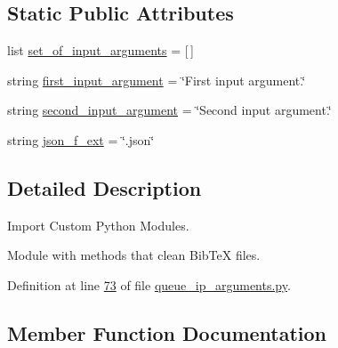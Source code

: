 \subsection*{Static Public Attributes}
\begin{DoxyCompactItemize}
\item 
list \hyperlink{classutilities_1_1queue__ip__arguments_1_1queue__ip__args_acc8e7685be71a7f95ede7c980355c9f3}{set\+\_\+of\+\_\+input\+\_\+arguments} = \mbox{[}$\,$\mbox{]}
\item 
string \hyperlink{classutilities_1_1queue__ip__arguments_1_1queue__ip__args_a14394c9820086e09d5b926d9910a180f}{first\+\_\+input\+\_\+argument} = \char`\"{}First input argument.\char`\"{}
\item 
string \hyperlink{classutilities_1_1queue__ip__arguments_1_1queue__ip__args_a0b179a70c0e57de2794d0d532e534c9c}{second\+\_\+input\+\_\+argument} = \char`\"{}Second input argument.\char`\"{}
\item 
string \hyperlink{classutilities_1_1queue__ip__arguments_1_1queue__ip__args_a8d93f9ade7608583602a9948c0d744f7}{json\+\_\+f\+\_\+ext} = \char`\"{}.json\char`\"{}
\end{DoxyCompactItemize}


\subsection{Detailed Description}
Import Custom Python Modules. 

Module with methods that clean Bib\+Te\+X files. 

Definition at line \hyperlink{queue__ip__arguments_8py_source_l00073}{73} of file \hyperlink{queue__ip__arguments_8py_source}{queue\+\_\+ip\+\_\+arguments.\+py}.



\subsection{Member Function Documentation}
\hypertarget{classutilities_1_1queue__ip__arguments_1_1queue__ip__args_a1a87ae4035acfa51fe1d1aff53f770f3}{}
